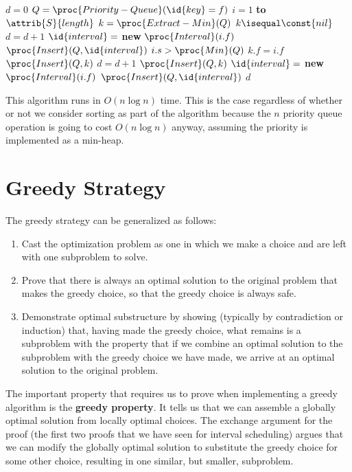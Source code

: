 \begin{codebox}
    \li $d = 0$
    \zi {} 
    \li $Q = \proc{Priority-Queue}(\id{key}=f)$ 
    \li \For $i = 1$ \textbf{to} $\attrib{S}{length}$ \Do
        \li $k = \proc{Extract-Min}(Q)$
        \li \If $k \isequal \const{nil}$ \Then
            \li $d = d + 1$
            \li $\id{interval} = $ \textbf{new} $\proc{Interval}(i.f)$ 
            \li $\proc{Insert}(Q,\id{interval})$
        \End
        \li \If $i.s > \proc{Min}(Q)$ \Then
            \zi {}
            \li $k.f = i.f$
            \li $\proc{Insert}(Q, k)$
        \li \Else
            \zi {}
            \li $d = d + 1$
            \li $\proc{Insert}(Q, k)$
            \li $\id{interval} = $ \textbf{new} $\proc{Interval}(i.f)$
            \li $\proc{Insert}(Q,\id{interval})$
        \End
    \End
    \li \Return $d$
\end{codebox}

This algorithm runs in $O(n \log n)$ time. This is the case regardless of whether or not we consider sorting as part of the algorithm because the $n$ priority queue operation is going to cost $O(n \log n)$ anyway, assuming the priority is implemented as a min-heap.

\section{Greedy Strategy}

The greedy strategy can be generalized as follows:

\begin{enumerate}
    \item Cast the optimization problem as one in which we make a choice and are left with one subproblem to solve.
    \item Prove that there is always an optimal solution to the original problem that makes the greedy choice, so that the greedy choice is always safe.
    \item Demonstrate optimal substructure by showing (typically by contradiction or induction) that, having made the greedy choice, what remains is a subproblem with the property that if we combine an optimal solution to the subproblem with the greedy choice we have made, we arrive at an optimal solution to the original problem.
\end{enumerate}

The important property that requires us to prove when implementing a greedy algorithm is the \textbf{greedy property}. It tells us that we can assemble a globally optimal solution from locally optimal choices. The exchange argument for the proof (the first two proofs that we have seen for interval scheduling) argues that we can modify the globally optimal solution to substitute the greedy choice for some other choice, resulting in one similar, but smaller, subproblem.